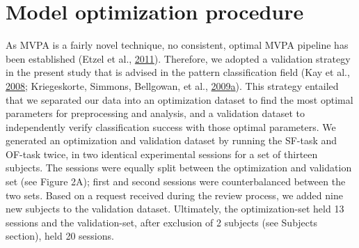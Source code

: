 \documentclass[11pt,american,]{memoir} %
\begin{document}
\hypertarget{shared-states-methods-model-optimization-procedure}{%
\section{Model optimization procedure}\label{shared-states-methods-model-optimization-procedure}}

As MVPA is a fairly novel technique, no consistent, optimal MVPA pipeline has been established (Etzel et al., \protect\hyperlink{ref-etzel2011impact}{2011}). Therefore, we adopted a validation strategy in the present study that is advised in the pattern classification field (Kay et al., \protect\hyperlink{ref-kay2008identifying}{2008}; Kriegeskorte, Simmons, Bellgowan, et al., \protect\hyperlink{ref-kriegeskorte2009circular}{2009}\protect\hyperlink{ref-kriegeskorte2009circular}{a}). This strategy entailed that we separated our data into an optimization dataset to find the most optimal parameters for preprocessing and analysis, and a validation dataset to independently verify classification success with those optimal parameters. We generated an optimization and validation dataset by running the SF-task and OF-task twice, in two identical experimental sessions for a set of thirteen subjects. The sessions were equally split between the optimization and validation set (see Figure 2A); first and second sessions were counterbalanced between the two sets. Based on a request received during the review process, we added nine new subjects to the validation dataset. Ultimately, the optimization-set held 13 sessions and the validation-set, after exclusion of 2 subjects (see Subjects section), held 20 sessions.
\end{document}
